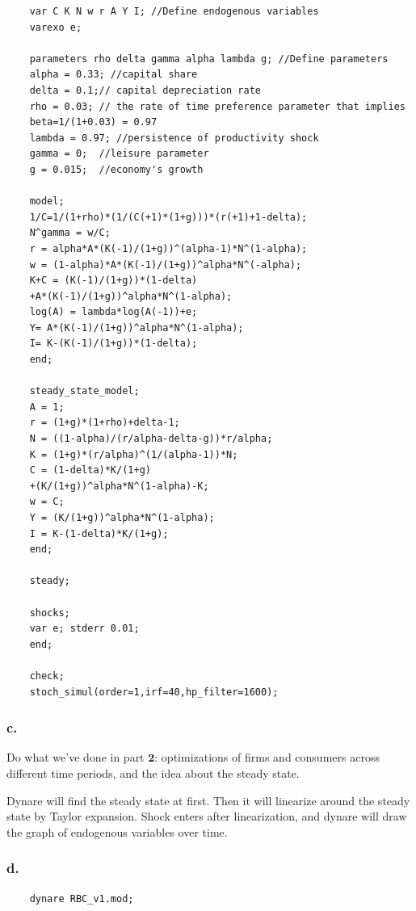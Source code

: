 \documentclass{article}
\begin{document}
\begin{lstlisting}
    var C K N w r A Y I; //Define endogenous variables
    varexo e;
    
    parameters rho delta gamma alpha lambda g; //Define parameters 
    alpha = 0.33; //capital share
    delta = 0.1;// capital depreciation rate
    rho = 0.03; // the rate of time preference parameter that implies 
    beta=1/(1+0.03) = 0.97
    lambda = 0.97; //persistence of productivity shock
    gamma = 0;  //leisure parameter 
    g = 0.015;  //economy's growth
    
    model;
    1/C=1/(1+rho)*(1/(C(+1)*(1+g)))*(r(+1)+1-delta);
    N^gamma = w/C; 
    r = alpha*A*(K(-1)/(1+g))^(alpha-1)*N^(1-alpha);
    w = (1-alpha)*A*(K(-1)/(1+g))^alpha*N^(-alpha);
    K+C = (K(-1)/(1+g))*(1-delta)
    +A*(K(-1)/(1+g))^alpha*N^(1-alpha);
    log(A) = lambda*log(A(-1))+e;
    Y= A*(K(-1)/(1+g))^alpha*N^(1-alpha);
    I= K-(K(-1)/(1+g))*(1-delta);
    end;
    
    steady_state_model;
    A = 1;
    r = (1+g)*(1+rho)+delta-1;
    N = ((1-alpha)/(r/alpha-delta-g))*r/alpha;
    K = (1+g)*(r/alpha)^(1/(alpha-1))*N;
    C = (1-delta)*K/(1+g)
    +(K/(1+g))^alpha*N^(1-alpha)-K;
    w = C;
    Y = (K/(1+g))^alpha*N^(1-alpha);
    I = K-(1-delta)*K/(1+g);
    end;
    
    steady;
    
    shocks;
    var e; stderr 0.01;
    end;
    
    check;
    stoch_simul(order=1,irf=40,hp_filter=1600);
\end{lstlisting}


\subsubsection*{\textrm{c.}}

Do what we've done in part $\mathbf{2}$: optimizations of firms and consumers across different time periods, and the idea about the steady state. 

Dynare will find the steady state at first. Then it will linearize around the steady state by Taylor expansion. Shock enters after linearization, and dynare will draw the graph of endogenous variables over time. 

\subsubsection*{\textrm{d.}}

\begin{lstlisting}
    dynare RBC_v1.mod;
\end{lstlisting}
\end{document}
